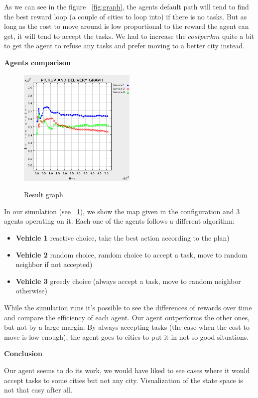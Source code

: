 \documentclass[11pt,a4paper]{article}
\begin{document}
\medskip
As we can see in the figure ~\ref{fig:graph}, the agents default path will tend
to find the best reward loop (a couple of cities to loop into) if there is no
tasks. But as long as the cost to move around is low proportional to the reward
the agent can get, it will tend to accept the tasks. We had to increase the
$ cost per km$ quite a bit to get the agent to refuse any tasks and prefer moving
to a better city instead.

\bigskip
\textbf{Agents comparison}

\begin{figure}
    \includegraphics[width=0.5\textwidth]{result.png}
    \caption{Result graph}{}
    \label{fig:result}
\end{figure}

In our simulation (see ~\ref{fig:result}), we show the map given in the
configuration and 3 agents operating on it. Each one of the agents follows a
different algorithm:

\begin{itemize}
    \item \textbf{Vehicle 1} reactive choice, take the best action according to the plan)
    \item \textbf{Vehicle 2} random choice, random choice to accept a task, move to
        random neighbor if not accepted)
    \item\textbf{Vehicle 3} greedy choice (always accept a task, move to random neighbor
        otherwise)
\end{itemize}

While the simulation runs it's possible to see the differences of rewards over
time and compare the efficiency of each agent. Our agent outperforms the other
ones, but not by a large margin. By always accepting tasks (the case when the
cost to move is low enough), the agent goes to cities to put it in not so good
situations.

\bigskip
\textbf{Conclusion}

Our agent seems to do its work, we would have liked to see cases where it would
accept tasks to some cities but not any city. Visualization of the state space
is not that easy after all.
\end{document}
